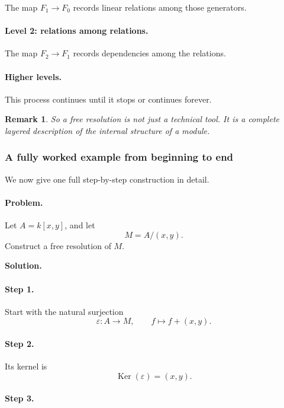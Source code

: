 \documentclass[12pt,a4paper]{article}
\theoremstyle{notespace}
\newtheorem{remark}{Remark}[section]
\newcommand{\kerf}{\operatorname{Ker}}
\begin{document}
The map \(F_1\to F_0\) records linear relations among those generators.

\paragraph{Level 2: relations among relations.}

The map \(F_2\to F_1\) records dependencies among the relations.

\paragraph{Higher levels.}

This process continues until it stops or continues forever.

\begin{remark}
	So a free resolution is not just a technical tool. It is a complete layered description of the internal structure of a module.
\end{remark}

\subsubsection{A fully worked example from beginning to end}

We now give one full step-by-step construction in detail.

\paragraph{Problem.}

Let \(A=k[x,y]\), and let
\[
M=A/(x,y).
\]
Construct a free resolution of \(M\).

\textbf{Solution.}

\paragraph{Step 1.}

Start with the natural surjection
\[
\varepsilon:A\to M,\qquad f\mapsto f+(x,y).
\]

\paragraph{Step 2.}

Its kernel is
\[
\kerf(\varepsilon)=(x,y).
\]

\paragraph{Step 3.}
\end{document}
